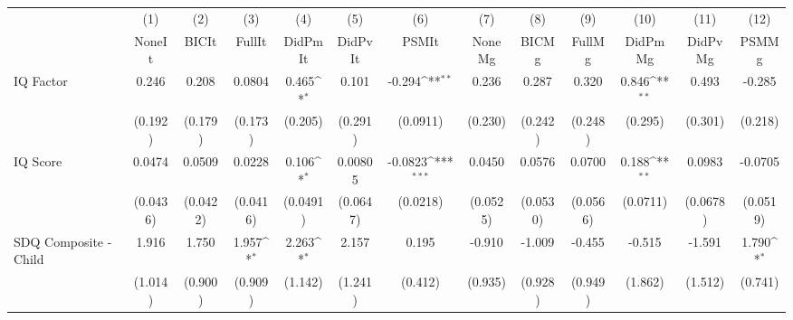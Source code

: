{
\def\sym#1{\ifmmode^{#1}\else\(^{#1}\)\fi}
\begin{tabular}{l*{12}{c}}
\toprule
            &\multicolumn{1}{c}{(1)}&\multicolumn{1}{c}{(2)}&\multicolumn{1}{c}{(3)}&\multicolumn{1}{c}{(4)}&\multicolumn{1}{c}{(5)}&\multicolumn{1}{c}{(6)}&\multicolumn{1}{c}{(7)}&\multicolumn{1}{c}{(8)}&\multicolumn{1}{c}{(9)}&\multicolumn{1}{c}{(10)}&\multicolumn{1}{c}{(11)}&\multicolumn{1}{c}{(12)}\\
            &\multicolumn{1}{c}{NoneIt}&\multicolumn{1}{c}{BICIt}&\multicolumn{1}{c}{FullIt}&\multicolumn{1}{c}{DidPmIt}&\multicolumn{1}{c}{DidPvIt}&\multicolumn{1}{c}{PSMIt}&\multicolumn{1}{c}{NoneMg}&\multicolumn{1}{c}{BICMg}&\multicolumn{1}{c}{FullMg}&\multicolumn{1}{c}{DidPmMg}&\multicolumn{1}{c}{DidPvMg}&\multicolumn{1}{c}{PSMMg}\\
\midrule
IQ Factor   &       0.246         &       0.208         &      0.0804         &       0.465\sym{*}  &       0.101         &      -0.294\sym{**} &       0.236         &       0.287         &       0.320         &       0.846\sym{**} &       0.493         &      -0.285         \\
            &     (0.192)         &     (0.179)         &     (0.173)         &     (0.205)         &     (0.291)         &    (0.0911)         &     (0.230)         &     (0.242)         &     (0.248)         &     (0.295)         &     (0.301)         &     (0.218)         \\
\addlinespace
IQ Score    &      0.0474         &      0.0509         &      0.0228         &       0.106\sym{*}  &     0.00805         &     -0.0823\sym{***}&      0.0450         &      0.0576         &      0.0700         &       0.188\sym{**} &      0.0983         &     -0.0705         \\
            &    (0.0436)         &    (0.0422)         &    (0.0416)         &    (0.0491)         &    (0.0647)         &    (0.0218)         &    (0.0525)         &    (0.0530)         &    (0.0566)         &    (0.0711)         &    (0.0678)         &    (0.0519)         \\
\addlinespace
SDQ Composite - Child&       1.916         &       1.750         &       1.957\sym{*}  &       2.263\sym{*}  &       2.157         &       0.195         &      -0.910         &      -1.009         &      -0.455         &      -0.515         &      -1.591         &       1.790\sym{*}  \\
            &     (1.014)         &     (0.900)         &     (0.909)         &     (1.142)         &     (1.241)         &     (0.412)         &     (0.935)         &     (0.928)         &     (0.949)         &     (1.862)         &     (1.512)         &     (0.741)         \\

\end{tabular}}
